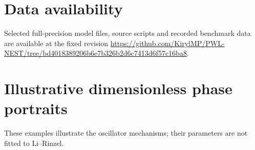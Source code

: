 \documentclass[final,5p,times,twocolumn]{elsarticle}
\begin{document}
\section*{Data availability}
Selected full-precision model files, source scripts and recorded benchmark data are available at the fixed revision \url{https://github.com/KirylMP/PWL-NEST/tree/bd4018389206b6e7b326b2d6c7413d6f57c16ba8}.

\clearpage
\appendix
\section{Illustrative dimensionless phase portraits}\label{app:phase-portraits}
These examples illustrate the oscillator mechanisms; their parameters are not fitted to Li--Rinzel.


\clearpage


\end{document}
